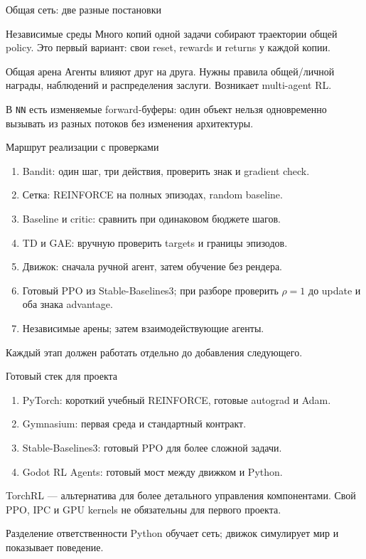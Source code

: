 \documentclass[aspectratio=169]{beamer}
\begin{document}
\begin{frame}{Общая сеть: две разные постановки}
  \begin{block}{Независимые среды}
    Много копий одной задачи собирают траектории общей policy.
    Это первый вариант: свои reset, rewards и returns у каждой копии.
  \end{block}
  \begin{block}{Общая арена}
    Агенты влияют друг на друга. Нужны правила общей/личной награды,
    наблюдений и распределения заслуги. Возникает multi-agent RL.
  \end{block}
  В \texttt{NN} есть изменяемые forward-буферы: один объект нельзя
  одновременно вызывать из разных потоков без изменения архитектуры.
\end{frame}

\begin{frame}{Маршрут реализации с проверками}
  \small
  \begin{enumerate}
    \item Bandit: один шаг, три действия, проверить знак и gradient check.
    \item Сетка: REINFORCE на полных эпизодах, random baseline.
    \item Baseline и critic: сравнить при одинаковом бюджете шагов.
    \item TD и GAE: вручную проверить targets и границы эпизодов.
    \item Движок: сначала ручной агент, затем обучение без рендера.
    \item Готовый PPO из Stable-Baselines3; при разборе проверить $\rho=1$ до update и оба знака advantage.
    \item Независимые арены; затем взаимодействующие агенты.
  \end{enumerate}
  Каждый этап должен работать отдельно до добавления следующего.
\end{frame}

\begin{frame}{Готовый стек для проекта}
  \begin{enumerate}
    \item PyTorch: короткий учебный REINFORCE, готовые autograd и Adam.
    \item Gymnasium: первая среда и стандартный контракт.
    \item Stable-Baselines3: готовый PPO для более сложной задачи.
    \item Godot RL Agents: готовый мост между движком и Python.
  \end{enumerate}
  TorchRL --- альтернатива для более детального управления компонентами.
  Свой PPO, IPC и GPU kernels не обязательны для первого проекта.
  \begin{block}{Разделение ответственности}
    Python обучает сеть; движок симулирует мир и показывает поведение.
  \end{block}
\end{frame}
\end{document}
